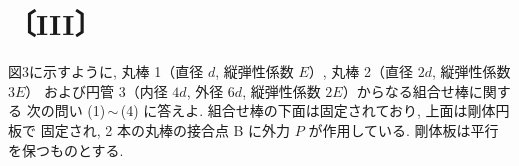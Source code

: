 
\section*{〔III〕}

図3に示すように, 丸棒 1（直径 $d$, 縦弾性係数 $E$）, 丸棒 2（直径 $2d$, 縦弾性係数 $3E$）
および円管 3（内径 $4d$, 外径 $6d$, 縦弾性係数 $2E$）からなる組合せ棒に関する
次の問い (1)\,$\sim$\,(4) に答えよ. 組合せ棒の下面は固定されており, 上面は剛体円板で
固定され, 2 本の丸棒の接合点 B に外力 $P$ が作用している. 剛体板は平行を保つものとする.

